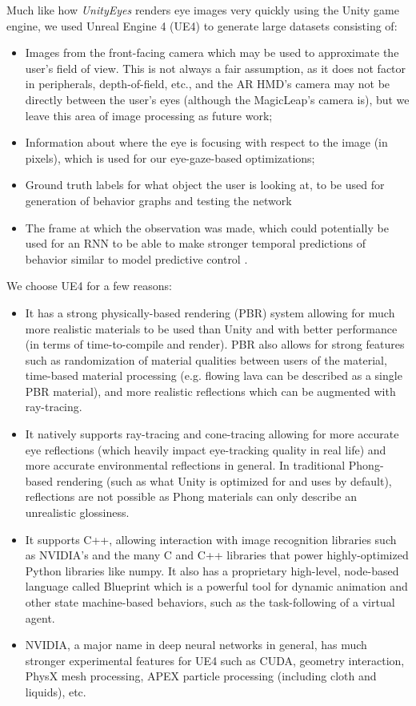 Much like how \emph{UnityEyes} \cite{wood2016learning} renders eye images very quickly using the Unity game engine, we used Unreal Engine 4 (UE4) to generate large datasets consisting of:
\begin{itemize}[noitemsep,leftmargin=*]
\item Images from the front-facing camera which may be used to approximate the user's field of view. This is not always a fair assumption, as it does not factor in peripherals, depth-of-field, etc., and the AR HMD's camera may not be directly between the user's eyes (although the MagicLeap's camera is), but we leave this area of image processing as future work; 
\item Information about where the eye is focusing with respect to the image (in pixels), which is used for our eye-gaze-based optimizations;
\item Ground truth labels for what object the user is looking at, to be used for generation of behavior graphs and testing the network
\item The frame at which the observation was made, which could potentially be used for an RNN to be able to make stronger temporal predictions of behavior similar to model predictive control \cite{garcia1989model,pan2011model}.
\end{itemize}
We choose UE4 for a few reasons:
\begin{itemize}[noitemsep,leftmargin=*]
    \item
        It has a strong physically-based rendering (PBR) system allowing for
        much more realistic materials to be used than Unity and with better
        performance (in terms of time-to-compile and render). PBR also allows for strong features such as randomization of material qualities between users of the material, time-based material processing (e.g. flowing lava can be described as a single PBR material), and more realistic reflections which can be augmented with ray-tracing.
    \item
        It natively supports ray-tracing and cone-tracing allowing for more
        accurate eye reflections (which heavily impact eye-tracking quality in
        real life) and more accurate environmental reflections in general. In traditional Phong-based rendering (such as what Unity is optimized for and uses by default), reflections are not possible as Phong materials can only describe an unrealistic glossiness.
    \item
        It supports C++, allowing interaction with image recognition libraries
        such as NVIDIA's and the many C and C++ libraries that power highly-optimized Python libraries like numpy. It also has a proprietary high-level, node-based language called Blueprint which is a powerful tool for dynamic animation and other state machine-based behaviors, such as the task-following of a virtual agent.
    \item
        NVIDIA, a major name in deep neural networks in general, has much
        stronger experimental features for UE4 such as CUDA, geometry
        interaction, PhysX mesh processing, APEX particle processing (including cloth and liquids), etc.
\end{itemize}

